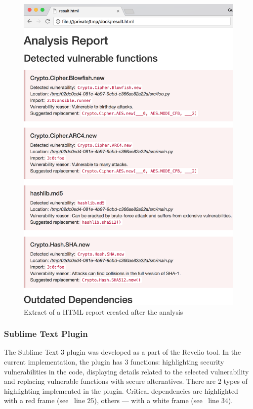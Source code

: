 \begin{figure}[h]
\centering
\includegraphics[width=\linewidth]{"figures/html"}
\caption{Extract of a HTML report created after the analysis}
\label{fig:html}
\end{figure}

\subsubsection{Sublime Text Plugin}

The Sublime Text 3 plugin was developed as a part of the Revelio tool. In the current implementation, the plugin has 3 functions: highlighting security vulnerabilities in the code, displaying details related to the selected vulnerability and replacing vulnerable functions with secure alternatives. There are 2 types of highlighting implemented in the plugin. Critical dependencies are highlighted with a red frame (see~ line 25), others — with a white frame (see~ line 34).

